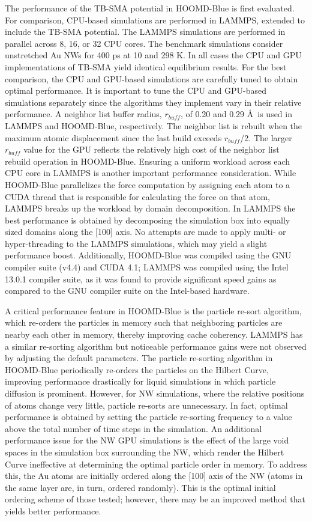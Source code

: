 \documentclass[10pt]{report}  %
\newcommand\findent{\hspace*{\parindent}}
\begin{document}
\findent The performance of the TB-SMA potential in HOOMD-Blue is first evaluated. For comparison, CPU-based simulations are performed in LAMMPS, \cite{Plimpton:1995} extended to include the TB-SMA potential. The LAMMPS simulations are performed in parallel across 8, 16, or 32 CPU cores. The benchmark simulations consider unstretched Au NWs for 400 ps at 10 and 298 K. In all cases the CPU and GPU implementations of TB-SMA yield identical equilibrium results. For the best comparison, the CPU and GPU-based simulations are carefully tuned to obtain optimal performance. It is important to tune the CPU and GPU-based simulations separately since the algorithms they implement vary in their relative performance. A neighbor list buffer radius, $r_{buff}$, of 0.20 and 0.29 \AA\ is used in LAMMPS and HOOMD-Blue, respectively. The neighbor list is rebuilt when the maximum atomic displacement since the last build exceeds $r_{buff}$/2. The larger $r_{buff}$ value for the GPU reflects the relatively high cost of the neighbor list rebuild operation in HOOMD-Blue. Ensuring a uniform workload across each CPU core in LAMMPS is another important performance consideration. While HOOMD-Blue parallelizes the force computation by assigning each atom to a CUDA thread that is responsible for calculating the force on that atom, LAMMPS breaks up the workload by domain decomposition. In LAMMPS the best performance is obtained by decomposing the simulation box into equally sized domains along the [100] axis. No attempts are made to apply multi- or hyper-threading \cite{Morozov:2011} to the LAMMPS simulations, which may yield a slight performance boost. Additionally, HOOMD-Blue was compiled using the GNU compiler suite (v4.4) and CUDA 4.1; LAMMPS was compiled using the Intel 13.0.1 compiler suite, as it was found to provide significant speed gains as compared to the GNU compiler suite on the Intel-based hardware.

A critical performance feature in HOOMD-Blue is the particle re-sort algorithm, which re-orders the particles in memory such that neighboring particles are nearby each other in memory, thereby improving cache coherency. \cite{Anderson:2008} LAMMPS has a similar re-sorting algorithm but noticeable performance gains were not observed by adjusting the default parameters. The particle re-sorting algorithm in HOOMD-Blue periodically re-orders the particles on the Hilbert Curve,\cite{Moon:2001} improving performance drastically for liquid simulations in which particle diffusion is prominent. However, for NW simulations, where the relative positions of atoms change very little, particle re-sorts are unnecessary. In fact, optimal performance is obtained by setting the particle re-sorting frequency to a value above the total number of time steps in the simulation. An additional performance issue for the NW GPU simulations is the effect of the large void spaces in the simulation box surrounding the NW, which render the Hilbert Curve ineffective at determining the optimal particle order in memory. To address this, the Au atoms are initially ordered along the [100] axis of the NW (atoms in the same layer are, in turn, ordered randomly). This is the optimal initial ordering scheme of those tested; however, there may be an improved method that yields better performance.
\end{document}
